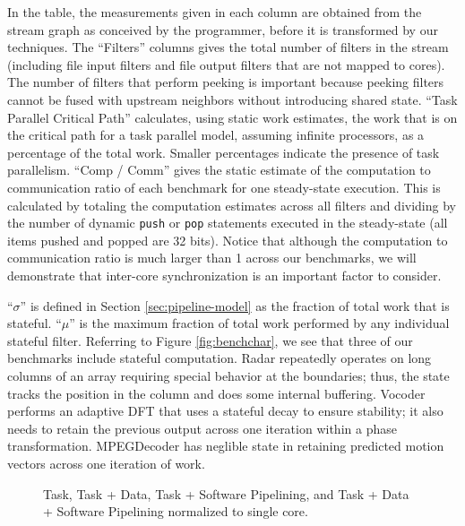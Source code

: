 In the table, the measurements given in each column are obtained from
the stream graph as conceived by the programmer, before it is
transformed by our techniques.  The ``Filters'' columns gives the
total number of filters in the stream (including file input filters
and file output filters that are not mapped to cores).  The number of
filters that perform peeking is important because peeking filters
cannot be fused with upstream neighbors without introducing shared
state. ``Task Parallel Critical Path'' calculates, using static work
estimates, the work that is on the critical path for a task parallel
model, assuming infinite processors, as a percentage of the total
work.  Smaller percentages indicate the presence of task parallelism.
``Comp / Comm'' gives the static estimate of the computation to
communication ratio of each benchmark for one steady-state
execution. This is calculated by totaling the computation estimates
across all filters and dividing by the number of dynamic {\tt push} or
{\tt pop} statements executed in the steady-state (all items pushed
and popped are 32 bits). Notice that although the computation to
communication ratio is much larger than 1 across our benchmarks, we
will demonstrate that inter-core synchronization is an important
factor to consider.

``$\sigma$'' is defined in Section \ref{sec:pipeline-model} as the
fraction of total work that is stateful.  ``$\mu$'' is the maximum
fraction of total work performed by any individual stateful
filter. Referring to Figure \ref{fig:benchchar}, we see that three of
our benchmarks include stateful computation.  Radar repeatedly
operates on long columns of an array requiring special behavior at the
boundaries; thus, the state tracks the position in the column and does
some internal buffering.  Vocoder performs an adaptive DFT that uses a
stateful decay to ensure stability; it also needs to retain the
previous output across one iteration within a phase transformation.
MPEGDecoder has neglible state in retaining predicted motion vectors
across one iteration of work.

\begin{figure*}[t]
\centering
{}
\caption{Task, Task + Data, Task + Software Pipelining, and Task + Data + Software Pipelining
normalized to single core.
\protect\label{fig:main_comp}}
\vspace{-6pt}
\end{figure*}

